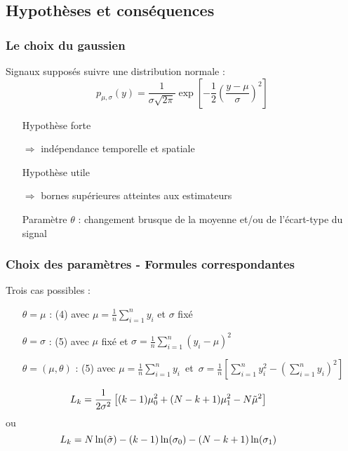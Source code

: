 \documentclass{beamer}
\begin{document}

\subsection{Hypothèses et conséquences}

\begin{frame}
	\frametitle{Le choix du gaussien}
	Signaux supposés suivre une distribution normale :
	\begin{equation}
		p_{\mu, \sigma}(y) = \frac1{\sigma\sqrt{2 \pi}} \exp \left[ -\frac12 \left( \frac{y - \mu}{\sigma} \right)^2 \right]
	\end{equation}
	\begin{itemize}
		\item[Hypothèse] forte
		\item[$\Longrightarrow$] indépendance temporelle et spatiale
		\item[Hypothèse] utile
		\item[$\Longrightarrow$] bornes supérieures atteintes aux estimateurs
		\vspace{.25cm}
		\item[Paramètre] $\theta$ : changement brusque de la moyenne et/ou de l'écart-type du signal
	\end{itemize}
\end{frame}

\begin{frame}
	\frametitle{Choix des paramètres - Formules correspondantes}
	Trois cas possibles :
	\vspace*{.3cm}
	\begin{itemize}
		\item[$\theta=\mu$]: (4) avec $\mu=\frac1n\sum_{i=1}^ny_i$ et $\sigma$ fixé
		\vspace*{.2cm}
		\item[$\theta=\sigma$]:  (5) avec $\mu$ fixé et $\sigma=\frac1n\sum_{i=1}^n(y_i-\mu)^2$
		\vspace*{.2cm}
		\item[$\theta=(\mu,\theta)$]: (5) avec \mbox{$\mu=\frac1n\sum_{i=1}^ny_i$ et $\sigma=\frac1n\left[\sum_{i=1}^ny_i^2-(\sum_{i=1}^ny_i)^2\right]$}
	\end{itemize}
	\vspace*{0.8cm}
	\begin{equation}
	\hspace{-1cm}	L_k=\frac 1{2\sigma^2}\left[(k-1)\mu_0^2+(N-k+1)\mu_1^2-N\tilde\mu^2\right]
	\end{equation}
	ou
	\begin{equation}
	\hspace{-1cm}	L_k=N\ln(\tilde\sigma)-(k-1)\ln(\sigma_0)-(N-k+1)\ln(\sigma_1)
	\end{equation}
\end{frame}


\end{document}
\end{frame}
\end{document}
